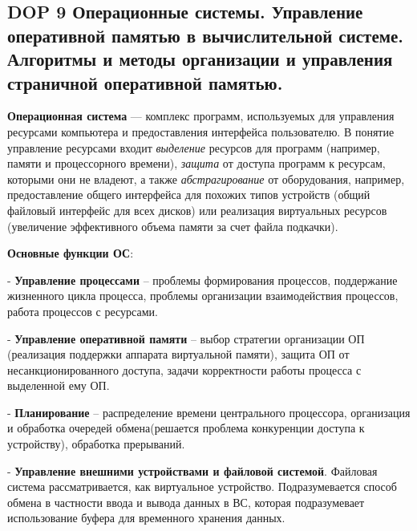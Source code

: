 \subsection{DOP 9 Операционные системы. Управление оперативной памятью в вычислительной системе. Алгоритмы и методы организации и управления страничной оперативной памятью.}

\textbf{Операционная система} --- комплекс программ, используемых для управления ресурсами компьютера и предоставления интерфейса пользователю.
В понятие управление ресурсами входит \textit{выделение} ресурсов для программ (например, памяти и процессорного времени),
\textit{защита} от доступа программ к ресурсам, которыми они не владеют, а также
\textit{абстрагирование} от оборудования, например, предоставление общего интерфейса для похожих типов устройств
(общий файловый интерфейс для всех дисков) или реализация виртуальных ресурсов (увеличение эффективного объема памяти за счет файла подкачки).



\textbf{Основные функции ОС}:

- \textbf{Управление процессами} -- проблемы формирования процессов, поддержание жизненного цикла процесса, проблемы организации взаимодействия процессов, работа процессов с ресурсами.

- \textbf{Управление оперативной памяти} -- выбор стратегии организации ОП (реализация поддержки аппарата виртуальной памяти), защита ОП от несанкционированного доступа, задачи корректности работы процесса с выделенной ему ОП.

- \textbf{Планирование} -- распределение времени центрального процессора, организация и обработка очередей обмена(решается проблема конкуренции доступа к устройству), обработка прерываний.

- \textbf{Управление внешними устройствами и файловой системой}. Файловая система рассматривается, как виртуальное устройство. Подразумевается способ обмена в частности ввода и вывода данных в ВС, которая подразумевает использование буфера для временного хранения данных.

